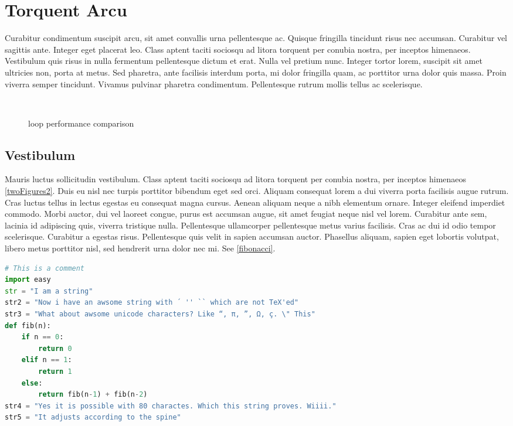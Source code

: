 \section{Torquent Arcu}
Curabitur condimentum suscipit arcu, sit amet convallis urna pellentesque ac. Quisque fringilla tincidunt risus nec accumsan. Curabitur vel sagittis ante. Integer eget placerat leo. Class aptent taciti sociosqu ad litora torquent per conubia nostra, per inceptos himenaeos. Vestibulum quis risus in nulla fermentum pellentesque dictum et erat. Nulla vel pretium nunc. Integer tortor lorem, suscipit sit amet ultricies non, porta at metus. Sed pharetra, ante facilisis interdum porta, mi dolor fringilla quam, ac porttitor urna dolor quis massa. Proin viverra semper tincidunt. Vivamus pulvinar pharetra condimentum. Pellentesque rutrum mollis tellus ac scelerisque.

\begin{figure}
    \centering
        \subbottom[1 pass]{
            \missingfigure[figwidth=6cm]{}
            \label{twoFigures1}
        }
        ~
        \subbottom[5 passes]{
            \missingfigure[figwidth=6cm]{}
            \label{twoFigures2}
        }
        \caption{loop performance comparison}
    \label{twoFigures}
\end{figure}

\subsection{Vestibulum}
Mauris luctus sollicitudin vestibulum. Class aptent taciti sociosqu ad litora torquent per conubia nostra, per inceptos himenaeos \cref{twoFigures2}. Duis eu nisl nec turpis porttitor bibendum eget sed orci. Aliquam consequat lorem a dui viverra porta facilisis augue rutrum. Cras luctus tellus in lectus egestas eu consequat magna cursus. Aenean aliquam neque a nibh elementum ornare. Integer eleifend imperdiet commodo. Morbi auctor, dui vel laoreet congue, purus est accumsan augue, sit amet feugiat neque nisl vel lorem. Curabitur ante sem, lacinia id adipiscing quis, viverra tristique nulla. Pellentesque ullamcorper pellentesque metus varius facilisis. Cras ac dui id odio tempor scelerisque. Curabitur a egestas risus. Pellentesque quis velit in sapien accumsan auctor. Phasellus aliquam, sapien eget lobortis volutpat, libero metus porttitor nisl, sed hendrerit urna dolor nec mi. See \cref{fibonacci}.

\begin{adjustwidth*}{0cm}{-0.4cm}
\begin{lstlisting}[language=Python,caption=Fibonacci,label=fibonacci]
# This is a comment
import easy
str = "I am a string"
str2 = "Now i have an awsome string with ´ '' `` which are not TeX'ed"
str3 = "What about awsome unicode characters? Like “, π, ”, Ω, ç. \" This"
def fib(n):
    if n == 0:
        return 0
    elif n == 1:
        return 1
    else:
        return fib(n-1) + fib(n-2)
str4 = "Yes it is possible with 80 charactes. Which this string proves. Wiiii."
str5 = "It adjusts according to the spine"
\end{lstlisting}
\end{adjustwidth*}


